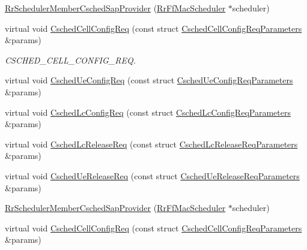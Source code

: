 \begin{DoxyCompactItemize}
\item 
\hyperlink{classns3_1_1RrSchedulerMemberCschedSapProvider_a5a937e9bde8714fc683b6bac74946fa5}{Rr\+Scheduler\+Member\+Csched\+Sap\+Provider} (\hyperlink{classns3_1_1RrFfMacScheduler}{Rr\+Ff\+Mac\+Scheduler} $\ast$scheduler)
\item 
virtual void \hyperlink{classns3_1_1RrSchedulerMemberCschedSapProvider_a5bf2ca477a3ae9ba2fade1160efca2bd}{Csched\+Cell\+Config\+Req} (const struct \hyperlink{structns3_1_1FfMacCschedSapProvider_1_1CschedCellConfigReqParameters}{Csched\+Cell\+Config\+Req\+Parameters} \&params)
\begin{DoxyCompactList}\small\item\em C\+S\+C\+H\+E\+D\+\_\+\+C\+E\+L\+L\+\_\+\+C\+O\+N\+F\+I\+G\+\_\+\+R\+EQ. \end{DoxyCompactList}\item 
virtual void \hyperlink{classns3_1_1RrSchedulerMemberCschedSapProvider_a3e5827d68ca3244547e2f6befc1bbbd4}{Csched\+Ue\+Config\+Req} (const struct \hyperlink{structns3_1_1FfMacCschedSapProvider_1_1CschedUeConfigReqParameters}{Csched\+Ue\+Config\+Req\+Parameters} \&params)
\item 
virtual void \hyperlink{classns3_1_1RrSchedulerMemberCschedSapProvider_a3b9ecd15632d65db0accffd602cc11ae}{Csched\+Lc\+Config\+Req} (const struct \hyperlink{structns3_1_1FfMacCschedSapProvider_1_1CschedLcConfigReqParameters}{Csched\+Lc\+Config\+Req\+Parameters} \&params)
\item 
virtual void \hyperlink{classns3_1_1RrSchedulerMemberCschedSapProvider_af399d3267614ea48b596eebc2b93cbcf}{Csched\+Lc\+Release\+Req} (const struct \hyperlink{structns3_1_1FfMacCschedSapProvider_1_1CschedLcReleaseReqParameters}{Csched\+Lc\+Release\+Req\+Parameters} \&params)
\item 
virtual void \hyperlink{classns3_1_1RrSchedulerMemberCschedSapProvider_ae242835b225a1c5b3b4370fe1fbbdfcd}{Csched\+Ue\+Release\+Req} (const struct \hyperlink{structns3_1_1FfMacCschedSapProvider_1_1CschedUeReleaseReqParameters}{Csched\+Ue\+Release\+Req\+Parameters} \&params)
\item 
\hyperlink{classns3_1_1RrSchedulerMemberCschedSapProvider_a5a937e9bde8714fc683b6bac74946fa5}{Rr\+Scheduler\+Member\+Csched\+Sap\+Provider} (\hyperlink{classns3_1_1RrFfMacScheduler}{Rr\+Ff\+Mac\+Scheduler} $\ast$scheduler)
\item 
virtual void \hyperlink{classns3_1_1RrSchedulerMemberCschedSapProvider_a21b757b7a8bbf2d26e022d019b0d2c03}{Csched\+Cell\+Config\+Req} (const struct \hyperlink{structns3_1_1FfMacCschedSapProvider_1_1CschedCellConfigReqParameters}{Csched\+Cell\+Config\+Req\+Parameters} \&params)

\end{DoxyCompactItemize}
